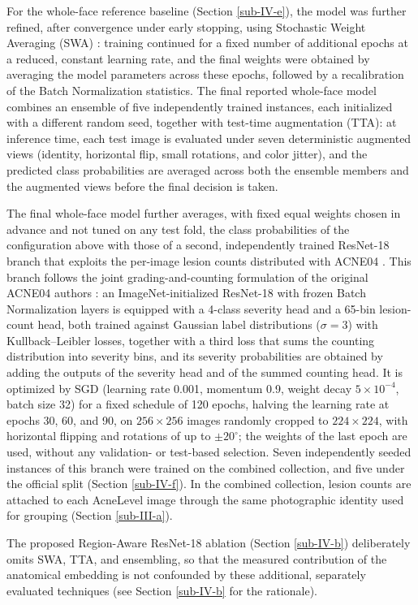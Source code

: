 \documentclass[conference]{IEEEtran}
\begin{document}
For the whole-face reference baseline (Section \ref{sub-IV-e}), the model was further refined, after convergence under early stopping, using Stochastic Weight Averaging (SWA) \cite{b29}: training continued for a fixed number of additional epochs at a reduced, constant learning rate, and the final weights were obtained by averaging the model parameters across these epochs, followed by a recalibration of the Batch Normalization statistics. The final reported whole-face model combines an ensemble of five independently trained instances, each initialized with a different random seed, together with test-time augmentation (TTA): at inference time, each test image is evaluated under seven deterministic augmented views (identity, horizontal flip, small rotations, and color jitter), and the predicted class probabilities are averaged across both the ensemble members and the augmented views before the final decision is taken.

The final whole-face model further averages, with fixed equal weights chosen in advance and not tuned on any test fold, the class probabilities of the configuration above with those of a second, independently trained ResNet-18 branch that exploits the per-image lesion counts distributed with ACNE04 \cite{b30}. This branch follows the joint grading-and-counting formulation of the original ACNE04 authors \cite{b30}: an ImageNet-initialized ResNet-18 with frozen Batch Normalization layers is equipped with a 4-class severity head and a 65-bin lesion-count head, both trained against Gaussian label distributions ($\sigma=3$) with Kullback--Leibler losses, together with a third loss that sums the counting distribution into severity bins, and its severity probabilities are obtained by adding the outputs of the severity head and of the summed counting head. It is optimized by SGD (learning rate 0.001, momentum 0.9, weight decay $5\times10^{-4}$, batch size 32) for a fixed schedule of 120 epochs, halving the learning rate at epochs 30, 60, and 90, on $256\times256$ images randomly cropped to $224\times224$, with horizontal flipping and rotations of up to $\pm20^\circ$; the weights of the last epoch are used, without any validation- or test-based selection. Seven independently seeded instances of this branch were trained on the combined collection, and five under the official split (Section \ref{sub-IV-f}). In the combined collection, lesion counts are attached to each AcneLevel image through the same photographic identity used for grouping (Section \ref{sub-III-a}).

The proposed Region-Aware ResNet-18 ablation (Section \ref{sub-IV-b}) deliberately omits SWA, TTA, and ensembling, so that the measured contribution of the anatomical embedding is not confounded by these additional, separately evaluated techniques (see Section \ref{sub-IV-b} for the rationale).
\end{document}
